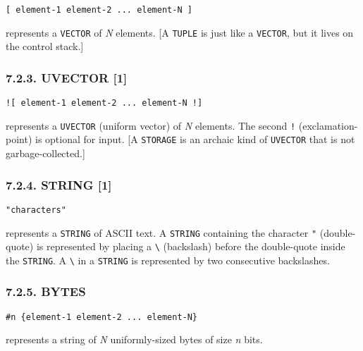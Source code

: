 \documentclass[a4paper,]{article}
\begin{document}
\begin{verbatim}
[ element-1 element-2 ... element-N ]
\end{verbatim}

\index{\texttt{[}|textbf} \index{\texttt{]}|textbf} represents a \texttt{VECTOR} of \emph{N}
elements. {[}A \texttt{TUPLE} is just like a \texttt{VECTOR}, but it lives on the control stack.{]}

\subsubsection{7.2.3. UVECTOR {[}1{]}}\label{uvector-1}

\begin{verbatim}
![ element-1 element-2 ... element-N !]
\end{verbatim}

\index{\texttt{"![}|textbf}\index{\texttt{"!]}|textbf} represents a \texttt{UVECTOR}
(uniform vector) of \emph{N} elements. The second \texttt{!} (exclamation-point) is optional for input. {[}A
\texttt{STORAGE} is an archaic kind of \texttt{UVECTOR} that is not garbage-collected.{]}

\subsubsection{7.2.4. STRING {[}1{]}}\label{string-1}

\begin{verbatim}
"characters"
\end{verbatim}

represents a \texttt{STRING} of ASCII text. A \texttt{STRING} containing the character
\texttt{"}  (double-quote) is represented by placing a
\texttt{\textbackslash{}} (backslash) before the double-quote inside the
\texttt{STRING}. A \texttt{\textbackslash{}} in a \texttt{STRING} is represented by two consecutive backslashes.

\subsubsection{7.2.5. BYTES}\label{bytes}

\begin{verbatim}
#n {element-1 element-2 ... element-N}
\end{verbatim}

represents a string of \emph{N} uniformly-sized bytes of size \emph{n} bits.
\end{document}
